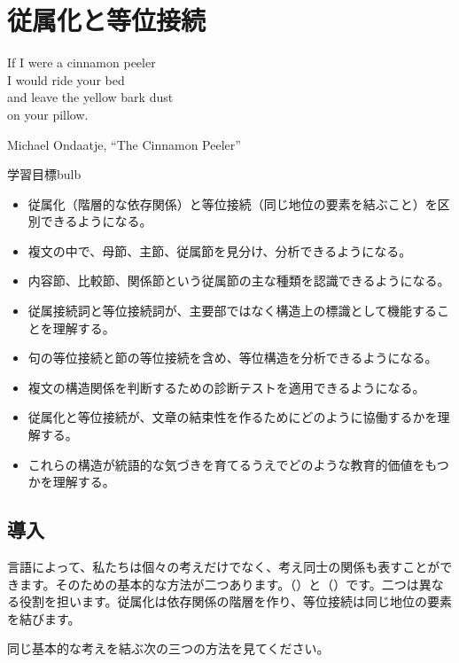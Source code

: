 \chapter{従属化と等位接続} \label{ch:subord-coord-ja}

\epigraph{If I were a cinnamon peeler\\
I would ride your bed\\
and leave the yellow bark dust\\
on your pillow.}{Michael Ondaatje, \enquote{The Cinnamon Peeler}}

\begin{tblsframedsymbol}{学習目標}{bulb}
\begin{itemize}[noitemsep, leftmargin=*]
    \item 従属化（階層的な依存関係）と等位接続（同じ地位の要素を結ぶこと）を区別できるようになる。
    \item 複文の中で、母節、主節、従属節を見分け、分析できるようになる。
    \item 内容節、比較節、関係節という従属節の主な種類を認識できるようになる。
    \item 従属接続詞と等位接続詞が、主要部ではなく構造上の標識として機能することを理解する。
    \item 句の等位接続と節の等位接続を含め、等位構造を分析できるようになる。
    \item 複文の構造関係を判断するための診断テストを適用できるようになる。
    \item 従属化と等位接続が、文章の結束性を作るためにどのように協働するかを理解する。
    \item これらの構造が統語的な気づきを育てるうえでどのような教育的価値をもつかを理解する。
\end{itemize}
\end{tblsframedsymbol}

\section{導入}

言語によって、私たちは個々の考えだけでなく、考え同士の関係も表すことができます。そのための基本的な方法が二つあります。（）と（）です。二つは異なる役割を担います。従属化は依存関係の階層を作り、等位接続は同じ地位の要素を結びます。

同じ基本的な考えを結ぶ次の三つの方法を見てください。

